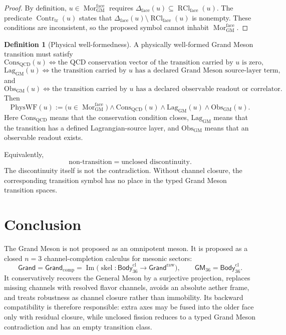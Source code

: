 \documentclass[11pt]{article}
\theoremstyle{definition}
\newtheorem{definition}{Definition}
\theoremstyle{plain}
\DeclareMathOperator{\Contr}{Contr}
\DeclareMathOperator{\Mor}{Mor}
\DeclareMathOperator{\RCl}{RCl}
\DeclareMathOperator{\skel}{skel}
\begin{document}
\begin{proof}
By definition, \(u\in\Mor^{\mathrm{face}}_{\mathrm{GM}}\) requires
\(\Delta_{\mathrm{face}}(u)\subseteq\RCl_{\mathrm{face}}(u)\).  The
predicate \(\Contr_{\mathrm{tr}}(u)\) states that
\(\Delta_{\mathrm{face}}(u)\setminus\RCl_{\mathrm{face}}(u)\) is nonempty.
These conditions are inconsistent, so the proposed symbol cannot inhabit
\(\Mor^{\mathrm{face}}_{\mathrm{GM}}\).
\end{proof}

\begin{definition}[Physical well-formedness]
A physically well-formed Grand Meson transition must satisfy
\[
  \mathrm{Cons}_{\mathrm{QCD}}(u)
  \Longleftrightarrow
  \text{the QCD conservation vector of the transition carried by }u
  \text{ is zero},
\]
\[
  \mathrm{Lag}_{\mathrm{GM}}(u)
  \Longleftrightarrow
  \text{the transition carried by }u
  \text{ has a declared Grand Meson source-layer term},
\]
and
\[
  \mathrm{Obs}_{\mathrm{GM}}(u)
  \Longleftrightarrow
  \text{the transition carried by }u
  \text{ has a declared observable readout or correlator}.
\]
Then
\[
  \mathrm{PhysWF}(u)
  :=
  \bigl(u\in\Mor^{\mathrm{face}}_{\mathrm{GM}}\bigr)
  \wedge
  \mathrm{Cons}_{\mathrm{QCD}}(u)
  \wedge
  \mathrm{Lag}_{\mathrm{GM}}(u)
  \wedge
  \mathrm{Obs}_{\mathrm{GM}}(u).
\]
Here \(\mathrm{Cons}_{\mathrm{QCD}}\) means that the conservation condition
closes, \(\mathrm{Lag}_{\mathrm{GM}}\) means that the transition has a
defined Lagrangian-source layer, and \(\mathrm{Obs}_{\mathrm{GM}}\) means
that an observable readout exists.
\end{definition}

Equivalently,
\[
  \text{non-transition}=\text{unclosed discontinuity}.
\]
The discontinuity itself is not the contradiction.  Without channel closure,
the corresponding transition symbol has no place in the typed Grand Meson
transition spaces.

\section{Conclusion}

The Grand Meson is not proposed as an omnipotent meson.  It is proposed as
a closed \(n=3\) channel-completion calculus for mesonic sectors:
\[
  \mathsf{Grand}=\mathsf{Grand}_{\mathrm{comp}}
  =
  \operatorname{Im}
  \bigl(\skel:\mathsf{Body}_{36}^{\mathrm{cl}}
  \to\mathsf{Grand}^{\mathrm{raw}}\bigr),
  \qquad
  \mathsf{GM}_{36}=\mathsf{Body}_{36}^{\mathrm{cl}}.
\]
It conservatively recovers the General Meson by a surjective projection,
replaces missing channels with resolved flavor channels, avoids an absolute aether frame,
and treats robustness as channel closure rather than immobility.  Its backward
compatibility is therefore responsible: extra axes may be fused into the
older face only with residual closure, while unclosed fission reduces to a
typed Grand Meson contradiction and has an empty transition class.
\end{document}
